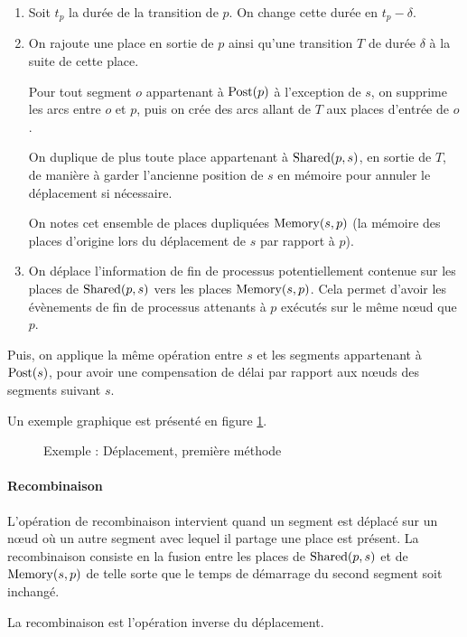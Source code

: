 \begin{enumerate}
\item Soit $t_p$ la durée de la transition de $p$. On change cette durée en $t_p - \delta$.
\item On rajoute une place en sortie de $p$ ainsi qu'une transition $T$ de durée $\delta$ à la suite de cette place. 

Pour tout segment $o$ appartenant à $\operatorname{Post}(p)$ à l'exception de $s$, on supprime les arcs entre $o$ et $p$, puis on crée des arcs allant de $T$ aux places d'entrée de $o$.

On duplique de plus toute place appartenant à $\operatorname{Shared}(p, s)$, en sortie de $T$, de manière à garder l'ancienne position de $s$ en mémoire pour annuler le déplacement si nécessaire.

On notes cet ensemble de places dupliquées $\operatorname{Memory}(s, p)$ (la mémoire des places d'origine lors du déplacement de $s$ par rapport à $p$).
 
\item On déplace l'information de fin de processus potentiellement contenue sur les places de $\operatorname{Shared}(p, s)$ vers les places  $\operatorname{Memory}(s, p)$. Cela permet d'avoir les évènements de fin de processus attenants à $p$ exécutés sur le même nœud que $p$.
\end{enumerate}

Puis, on applique la même opération entre $s$ et les segments appartenant à $\operatorname{Post}(s)$, pour avoir une compensation de délai par rapport aux nœuds des segments suivant $s$.

Un exemple graphique est présenté en figure \ref{fig:deplacementMethode1}.

\begin{figure}[h!]
\centering

\caption{Exemple : Déplacement, première méthode}
\label{fig:deplacementMethode1}
\end{figure}

\paragraph{Recombinaison}
L'opération de recombinaison intervient quand un segment est déplacé sur un nœud où un autre segment avec lequel il partage une place est présent.
La recombinaison consiste en la fusion entre les places de $\operatorname{Shared}(p, s)$ et de  $\operatorname{Memory}(s, p)$ de telle sorte que le temps de démarrage du second segment soit inchangé.

La recombinaison est l'opération inverse du déplacement.

